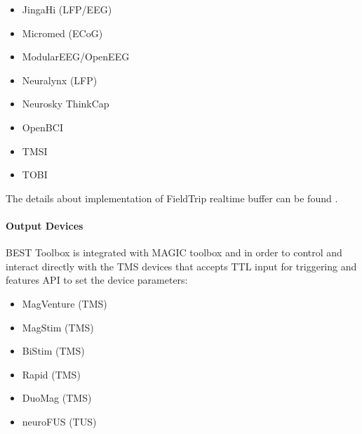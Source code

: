 \documentclass[letterpaper,10pt,english]{sphinxmanual}
\begin{document}
\begin{itemize}
\item {} 
\sphinxAtStartPar
Jinga\sphinxhyphen{}Hi (LFP/EEG)

\item {} 
\sphinxAtStartPar
Micromed (ECoG)

\item {} 
\sphinxAtStartPar
ModularEEG/OpenEEG

\item {} 
\sphinxAtStartPar
Neuralynx (LFP)

\item {} 
\sphinxAtStartPar
Neurosky ThinkCap

\item {} 
\sphinxAtStartPar
OpenBCI

\item {} 
\sphinxAtStartPar
TMSI

\item {} 
\sphinxAtStartPar
TOBI

\end{itemize}

\sphinxAtStartPar
The details about implementation of FieldTrip real\sphinxhyphen{}time buffer can be found .


\paragraph{Output Devices}
\label{\detokenize{1_Home:output-devices}}
\sphinxAtStartPar
BEST Toolbox is integrated with  MAGIC toolbox and   in order to control and interact directly with the TMS devices that accepts TTL input for triggering and features API to set the device parameters:
\begin{itemize}
\item {} 
\sphinxAtStartPar
MagVenture (TMS)

\item {} 
\sphinxAtStartPar
MagStim (TMS)

\item {} 
\sphinxAtStartPar
BiStim (TMS)

\item {} 
\sphinxAtStartPar
Rapid (TMS)

\item {} 
\sphinxAtStartPar
DuoMag (TMS)

\item {} 
\sphinxAtStartPar
neuroFUS (TUS)

\end{itemize}
\end{document}
